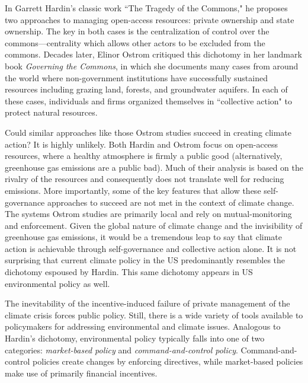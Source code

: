 In Garrett Hardin's classic work ``The Tragedy of the Commons,"  he proposes two approaches to managing open-access resources: private ownership and state ownership. The key in both cases is the centralization of control over the commons---centrality which allows other actors to be excluded from  the commons. Decades later, Elinor Ostrom critiqued this dichotomy in her landmark book \textit{Governing the Commons}, in which she documents many cases from around the world where non-government institutions have successfully sustained resources including grazing land, forests, and groundwater aquifers. In each of these cases, individuals and firms organized themselves in ``collective action" to protect natural resources. 

Could similar approaches like those Ostrom studies succeed in creating climate action? It is highly unlikely. Both Hardin and Ostrom focus on open-access resources, where a healthy atmosphere is firmly a public good (alternatively, greenhouse gas emissions are a public bad). Much of their analysis is based on the rivalry of the resources and consequently does not translate well for reducing emissions. More importantly, some of the key features that allow these self-governance approaches to succeed are not met in the context of climate change. The systems Ostrom studies are primarily local and rely on mutual-monitoring and enforcement. Given the global nature of climate change and the invisibility of greenhouse gas emissions, it would be a tremendous leap to say that climate action is achievable through self-governance and collective action alone. It is not surprising that current climate policy in the US predominantly resembles the dichotomy espoused by Hardin. This same dichotomy appears in US environmental policy as well.

The inevitability of the incentive-induced failure of private management of the climate crisis forces public policy. Still, there is a wide variety of tools available to policymakers for addressing environmental and climate issues. 
Analogous to Hardin's dichotomy, environmental policy typically falls into one of two categories: \emph{market-based policy} and \emph{command-and-control policy}. Command-and-control policies create changes by enforcing directives, while market-based policies make use of primarily financial incentives.

